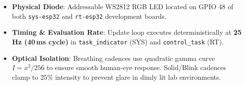 \documentclass[10pt,a4paper]{article}
\begin{document}
\begin{tcolorbox}[sectionbox, title=3. Hardware \& Implementation Notes]
\scriptsize
\begin{itemize}\setlength{\itemsep}{0pt}\setlength{\parskip}{0pt}
  \item \textbf{Physical Diode}: Addressable WS2812 RGB LED located on GPIO 48 of both \texttt{sys-esp32} and \texttt{rt-esp32} development boards.
  \item \textbf{Timing \& Evaluation Rate}: Update loop executes deterministically at \textbf{25\,Hz (40\,ms cycle)} in \texttt{task\_indicator} (SYS) and \texttt{control\_task} (RT).
  \item \textbf{Optical Isolation}: Breathing cadences use quadratic gamma curve $I = x^2 / 256$ to ensure smooth human-eye response. Solid/Blink cadences clamp to $25\%$ intensity to prevent glare in dimly lit lab environments.
\end{itemize}
\end{tcolorbox}
\end{document}
